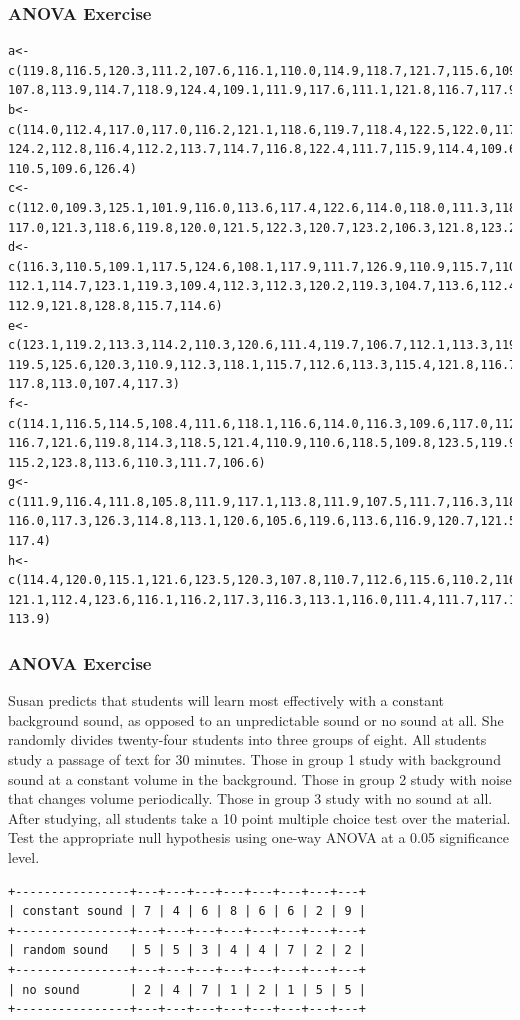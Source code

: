 \documentclass[xcolor=dvipsnames]{beamer}
\begin{document}
\begin{frame}
  \frametitle{ANOVA Exercise}
    \begin{scriptsize}
\begin{verbatim}
a<-c(119.8,116.5,120.3,111.2,107.6,116.1,110.0,114.9,118.7,121.7,115.6,109.4,
107.8,113.9,114.7,118.9,124.4,109.1,111.9,117.6,111.1,121.8,116.7,117.9,117.9)
b<-c(114.0,112.4,117.0,117.0,116.2,121.1,118.6,119.7,118.4,122.5,122.0,117.8,
124.2,112.8,116.4,112.2,113.7,114.7,116.8,122.4,111.7,115.9,114.4,109.6,123.2,
110.5,109.6,126.4)
c<-c(112.0,109.3,125.1,101.9,116.0,113.6,117.4,122.6,114.0,118.0,111.3,118.4,
117.0,121.3,118.6,119.8,120.0,121.5,122.3,120.7,123.2,106.3,121.8,123.2)
d<-c(116.3,110.5,109.1,117.5,124.6,108.1,117.9,111.7,126.9,110.9,115.7,110.8,
112.1,114.7,123.1,119.3,109.4,112.3,112.3,120.2,119.3,104.7,113.6,112.4,115.2,
112.9,121.8,128.8,115.7,114.6)
e<-c(123.1,119.2,113.3,114.2,110.3,120.6,111.4,119.7,106.7,112.1,113.3,119.3,
119.5,125.6,120.3,110.9,112.3,118.1,115.7,112.6,113.3,115.4,121.8,116.7,109.1,
117.8,113.0,107.4,117.3)
f<-c(114.1,116.5,114.5,108.4,111.6,118.1,116.6,114.0,116.3,109.6,117.0,112.0,
116.7,121.6,119.8,114.3,118.5,121.4,110.9,110.6,118.5,109.8,123.5,119.9,114.1,
115.2,123.8,113.6,110.3,111.7,106.6)
g<-c(111.9,116.4,111.8,105.8,111.9,117.1,113.8,111.9,107.5,111.7,116.3,118.4,
116.0,117.3,126.3,114.8,113.1,120.6,105.6,119.6,113.6,116.9,120.7,121.5,117.1,
117.4)
h<-c(114.4,120.0,115.1,121.6,123.5,120.3,107.8,110.7,112.6,115.6,110.2,116.3,
121.1,112.4,123.6,116.1,116.2,117.3,116.3,113.1,116.0,111.4,111.7,117.1,116.2,
113.9)
\end{verbatim}
  \end{scriptsize}
\end{frame}

\begin{frame}[fragile]
  \frametitle{ANOVA Exercise}
  Susan predicts that students will learn most effectively with a
  constant background sound, as opposed to an unpredictable sound
  or no sound at all. She randomly divides twenty-four students
  into three groups of eight. All students study a passage of text
  for 30 minutes. Those in group 1 study with background sound at
  a constant volume in the background. Those in group 2 study with
  noise that changes volume periodically. Those in group 3 study
  with no sound at all. After studying, all students take a 10
  point multiple choice test over the material. Test the
  appropriate null hypothesis using one-way ANOVA at a 0.05
  significance level.

\begin{footnotesize}
\begin{verbatim}
+----------------+---+---+---+---+---+---+---+---+
| constant sound | 7 | 4 | 6 | 8 | 6 | 6 | 2 | 9 |
+----------------+---+---+---+---+---+---+---+---+
| random sound   | 5 | 5 | 3 | 4 | 4 | 7 | 2 | 2 |
+----------------+---+---+---+---+---+---+---+---+
| no sound       | 2 | 4 | 7 | 1 | 2 | 1 | 5 | 5 |
+----------------+---+---+---+---+---+---+---+---+
\end{verbatim}
\end{footnotesize}
\end{frame}
\end{document}
